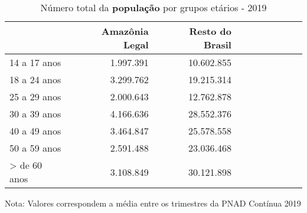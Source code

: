\begin{table}[H]
\centering
\label{\_retrato\_emprego\_fotografia\_faixa\_etaria\_table\_populacao}
\begin{threeparttable}
\caption{Número total da \textbf{população} por grupos etários - 2019}
\begin{tabular}{l*{3}{rrr}}
\midrule \midrule
                    &Amazônia Legal&Resto do Brasil\\
\midrule
14 a 17 anos        &   1.997.391&  10.602.855\\
18 a 24 anos        &   3.299.762&  19.215.314\\
25 a 29 anos        &   2.000.643&  12.762.878\\
30 a 39 anos        &   4.166.636&  28.552.376\\
40 a 49 anos        &   3.464.847&  25.578.558\\
50 a 59 anos        &   2.591.488&  23.036.468\\
> de 60 anos        &   3.108.849&  30.121.898\\
\bottomrule
\end{tabular}
\begin{tablenotes}
\scriptsize{Nota: Valores correspondem a média entre os trimestres da PNAD Contínua 2019}
\end{tablenotes}
\end{threeparttable}
\end{table}

